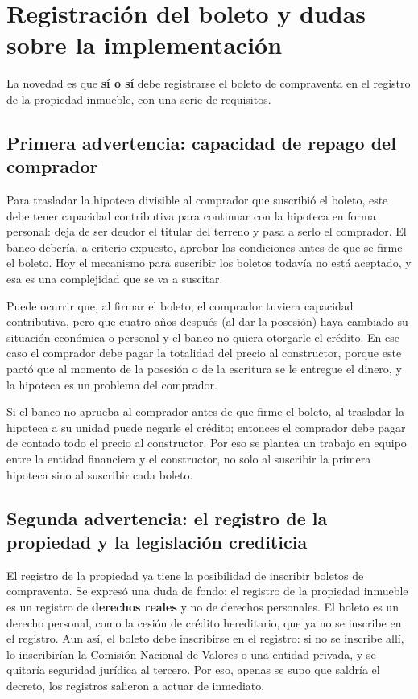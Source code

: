 \documentclass[12pt,oneside]{book}
\begin{document}
\section{Registración del boleto y dudas sobre la implementación}

La novedad es que \textbf{sí o sí} debe registrarse el boleto de compraventa en el registro de la propiedad inmueble, con una serie de requisitos.

\subsection{Primera advertencia: capacidad de repago del comprador}

Para trasladar la hipoteca divisible al comprador que suscribió el boleto, este debe tener capacidad contributiva para continuar con la hipoteca en forma personal: deja de ser deudor el titular del terreno y pasa a serlo el comprador. El banco debería, a criterio expuesto, aprobar las condiciones antes de que se firme el boleto. Hoy el mecanismo para suscribir los boletos todavía no está aceptado, y esa es una complejidad que se va a suscitar.

Puede ocurrir que, al firmar el boleto, el comprador tuviera capacidad contributiva, pero que cuatro años después (al dar la posesión) haya cambiado su situación económica o personal y el banco no quiera otorgarle el crédito. En ese caso el comprador debe pagar la totalidad del precio al constructor, porque este pactó que al momento de la posesión o de la escritura se le entregue el dinero, y la hipoteca es un problema del comprador.

\begin{important}
Si el banco no aprueba al comprador antes de que firme el boleto, al trasladar la hipoteca a su unidad puede negarle el crédito; entonces el comprador debe pagar de contado todo el precio al constructor. Por eso se plantea un trabajo en equipo entre la entidad financiera y el constructor, no solo al suscribir la primera hipoteca sino al suscribir cada boleto.
\end{important}

\subsection{Segunda advertencia: el registro de la propiedad y la legislación crediticia}

El registro de la propiedad ya tiene la posibilidad de inscribir boletos de compraventa. Se expresó una duda de fondo: el registro de la propiedad inmueble es un registro de \textbf{derechos reales} y no de derechos personales. El boleto es un derecho personal, como la cesión de crédito hereditario, que ya no se inscribe en el registro. Aun así, el boleto debe inscribirse en el registro: si no se inscribe allí, lo inscribirían la Comisión Nacional de Valores o una entidad privada, y se quitaría seguridad jurídica al tercero. Por eso, apenas se supo que saldría el decreto, los registros salieron a actuar de inmediato.
\end{document}
